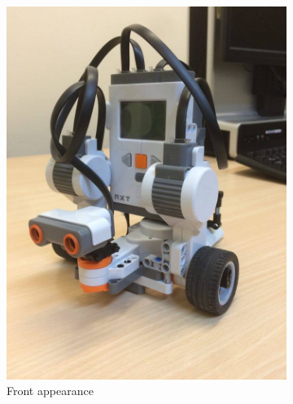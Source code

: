 \documentclass[12pt]{article}
\begin{document}
\begin{figure}[h]
\centering
  \begin{subfigure}{0.25\textwidth}
  \includegraphics[scale=0.15]{f}
  \caption{Front appearance}
  \end{subfigure}
  \begin{subfigure}{0.25\textwidth}

\end{subfigure}
\end{figure}
\end{document}
